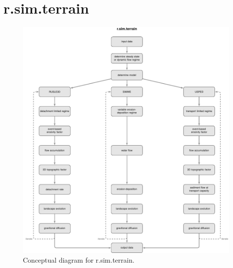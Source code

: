 \documentclass[gmd, manuscript]{copernicus}
\begin{document}
\section{r.sim.terrain}


\begin{figure}%
\center
\includegraphics[width=\textwidth,keepaspectratio]{figures/concept.pdf}
\caption{Conceptual diagram for r.sim.terrain.}
\label{fig:evolution}
\end{figure}

\end{document}
